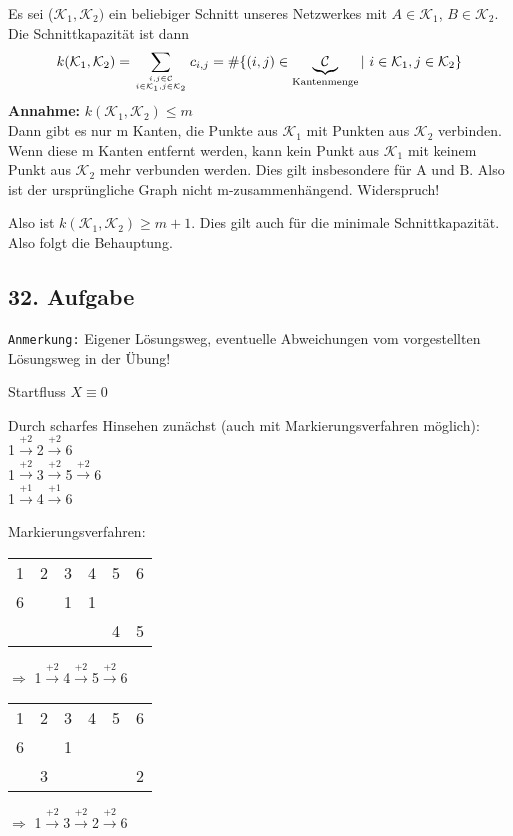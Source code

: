 \documentclass[a4paper,11pt,twoside,titlepage]{article}
\newcommand{\K}{{\mathcal K}}
\def\CC{ \mathcal{C} }
\begin{document}
Es sei ($\K_1,\K_2)$ ein beliebiger Schnitt unseres Netzwerkes mit $A\in \K_1$, $B\in \K_2$. Die Schnittkapazität ist dann
\[k(\K_1,\K_2)=\sum_{i,j\in\CC \atop i\in\K_1,j\in\K_2}c_{i,j}=\#\{(i,j)\in\underbrace{\CC}_{\textnormal{Kantenmenge}}|\ i\in\K_1, j\in\K_2\} \]
\textbf{Annahme:} $k(\K_1,\K_2)\le m$\\
Dann gibt es nur m Kanten, die Punkte aus $\K_1$ mit Punkten aus $\K_2$ verbinden. Wenn diese m Kanten entfernt werden, kann kein Punkt aus $\K_1$ mit keinem Punkt aus $\K_2$ mehr verbunden werden. Dies gilt insbesondere für A und B. Also ist der ursprüngliche Graph nicht m-zusammenhängend. Widerspruch!

Also ist $k(\K_1,\K_2)\ge m+1$. Dies gilt auch für die minimale Schnittkapazität. Also folgt die Behauptung.

\subsection*{32. Aufgabe}
\texttt{Anmerkung:} Eigener Lösungsweg, eventuelle Abweichungen vom vorgestellten\\ Lösungsweg in der Übung!

Startfluss $X\equiv0$

Durch scharfes Hinsehen zunächst (auch mit Markierungsverfahren möglich):\\
1$\stackrel{+2}{\longrightarrow}$2$\stackrel{+2}{\longrightarrow}$6\\
1$\stackrel{+2}{\longrightarrow}$3$\stackrel{+2}{\longrightarrow}$5$\stackrel{+2}{\longrightarrow}$6\\
1$\stackrel{+1}{\longrightarrow}$4$\stackrel{+1}{\longrightarrow}$6

Markierungsverfahren:


\begin{tabular}{cccccc}
1&2&3&4&5&6\\\cline{1-6}
6& &1 &1 & & \\
 & & & &4 &5 \\
\end{tabular}
$\Longrightarrow$ 1$\stackrel{+2}{\longrightarrow}$4$\stackrel{+2}{\longrightarrow}$5$\stackrel{+2}{\longrightarrow}$6

\begin{tabular}{cccccc}
1&2&3&4&5&6\\\cline{1-6}
6& &1 & & & \\
 & 3& & & &2 \\
\end{tabular}
$\Longrightarrow$ 1$\stackrel{+2}{\longrightarrow}$3$\stackrel{+2}{\longrightarrow}$2$\stackrel{+2}{\longrightarrow}$6
\end{document}

